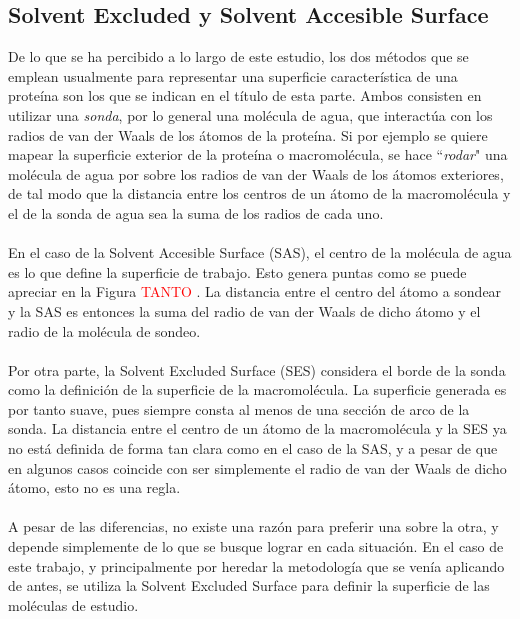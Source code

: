 \documentclass[12pt, oneside, numbers, spanish]{ezthesis}
\numberwithin{equation}{section}
\begin{document}
\subsection{Solvent Excluded y Solvent Accesible Surface}\label{subsec:SES_SAS}
De lo que se ha percibido a lo largo de este estudio, los dos métodos que se emplean usualmente para representar una superficie característica de una proteína son los que se indican en el título de esta parte. Ambos consisten en utilizar una \textit{sonda}, por lo general una molécula de agua, que interactúa con los radios de van der Waals de los átomos de la proteína. Si por ejemplo se quiere mapear la superficie exterior de la proteína o macromolécula, se hace ``\textit{rodar}" una molécula de agua por sobre los radios de van der Waals de los átomos exteriores, de tal modo que la distancia entre los centros de un átomo de la macromolécula y el de la sonda de agua sea la suma de los radios de cada uno.\\\\
En el caso de la Solvent Accesible Surface (SAS), el centro de la molécula de agua es lo que define la superficie de trabajo. Esto genera puntas como se puede apreciar en la Figura \textcolor{red}{TANTO} . La distancia entre el centro del átomo a sondear y la SAS es entonces la suma del radio de van der Waals de dicho átomo y el radio de la molécula de sondeo.\\\\
Por otra parte, la Solvent Excluded Surface (SES) considera el borde de la sonda como la definición de la superficie de la macromolécula. La superficie generada es por tanto suave, pues siempre consta al menos de una sección de arco de la sonda. La distancia entre el centro de un átomo de la macromolécula y la SES ya no está definida de forma tan clara como en el caso de la SAS, y a pesar de que en algunos casos coincide con ser simplemente el radio de van der Waals de dicho átomo, esto no es una regla.\\\\
A pesar de las diferencias, no existe una razón para preferir una sobre la otra, y depende simplemente de lo que se busque lograr en cada situación. En el caso de este trabajo, y principalmente por heredar la metodología que se venía aplicando de antes, se utiliza la Solvent Excluded Surface para definir la superficie de las moléculas de estudio.
\end{document}
